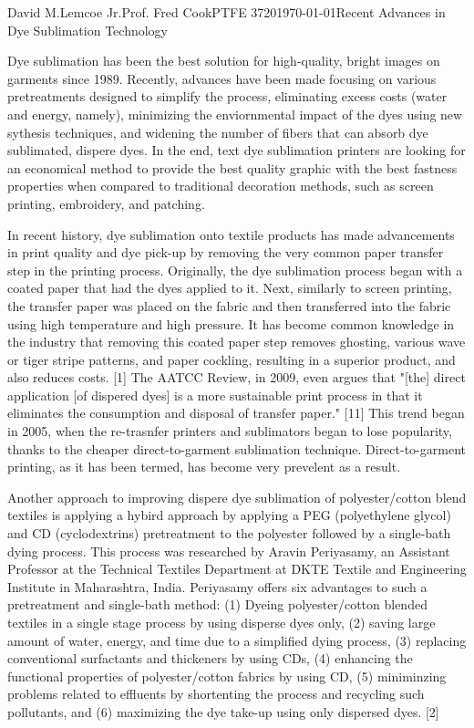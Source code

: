 \documentclass[12pt,letterpaper]{article}
\begin{document}
\begin{mla}{David M.}{Lemcoe Jr.}{Prof. Fred Cook}{PTFE 3720}{\today}{Recent Advances in Dye Sublimation Technology}

Dye sublimation has been the best solution for high-quality, bright images on garments since 1989. Recently, advances have been made focusing on various pretreatments designed to simplify the process, eliminating excess costs (water and energy, namely), minimizing the enviornmental impact of the dyes using new sythesis techniques, and widening the number of fibers that can absorb dye sublimated, dispere dyes. In the end, text dye sublimation printers are looking for an economical method to provide the best quality graphic with the best fastness properties when compared to traditional decoration methods, such as screen printing, embroidery, and patching.

In recent history, dye sublimation onto textile products has made advancements in print quality and dye pick-up by removing the very common paper transfer step in the printing process. Originally, the dye sublimation process began with a coated paper that had the dyes applied to it. Next, similarly to screen printing, the transfer paper was placed on the fabric and then transferred into the fabric using high temperature and high pressure. It has become common knowledge in the industry that removing this coated paper step removes ghosting, various wave or tiger stripe patterns, and paper cockling, resulting in a superior product, and also reduces costs. [1] The AATCC Review, in 2009, even argues that "[the] direct application [of dispered dyes] is a more sustainable print process in that it eliminates the consumption and disposal of transfer paper." [11] This trend began in 2005, when the re-trasnfer printers and sublimators began to lose popularity, thanks to the cheaper direct-to-garment sublimation technique. Direct-to-garment printing, as it has been termed, has become very prevelent as a result. 


Another approach to improving dispere dye sublimation of polyester/cotton blend textiles is applying a hybird approach by applying a PEG (polyethylene glycol) and CD (cyclodextrins) pretreatment to the polyester followed by a single-bath dying process. This process was researched by Aravin Periyasamy, an Assistant Professor at the Technical Textiles Department at DKTE Textile and Engineering Institute in Maharashtra, India. Periyasamy offers six advantages to such a pretreatment and single-bath method: (1) Dyeing polyester/cotton blended textiles in a single stage process by using disperse dyes only, (2) saving large amount of water, energy, and time due to a simplified dying process, (3) replacing conventional surfactants and thickeners by using CDs, (4) enhancing the functional properties of polyester/cotton fabrics by using CD, (5) miniminzing problems related to effluents by shortenting the process and recycling such pollutants, and (6) maximizing the dye take-up using only dispersed dyes. [2]


\end{mla}
\end{document}
